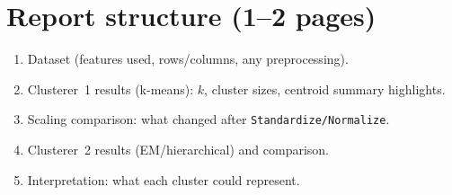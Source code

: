 \documentclass[11pt]{article}
\begin{document}
\section{Report structure (1--2 pages)}
\begin{enumerate}[leftmargin=*]
  \item Dataset (features used, rows/columns, any preprocessing).
  \item Clusterer~1 results (k-means): $k$, cluster sizes, centroid summary highlights.
  \item Scaling comparison: what changed after \texttt{Standardize/Normalize}.
  \item Clusterer~2 results (EM/hierarchical) and comparison.
  \item Interpretation: what each cluster could represent.
\end{enumerate}

\notesources{\AIMLLabSources}
\end{document}
